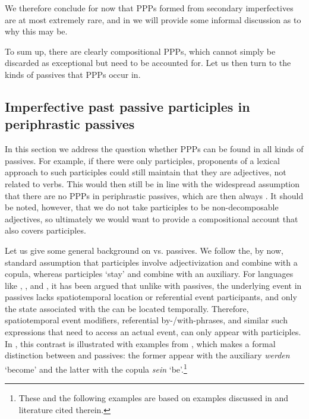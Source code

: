 \documentclass[output=paper,modfonts,newtxmath,hidelinks]{langscibook}
\begin{document}
\noindent We therefore conclude for now that PPPs formed from secondary imperfectives are at most extremely rare, and in  we will provide some informal discussion as to why this may be. 

To sum up, there are clearly compositional  PPPs, which cannot simply be discarded as exceptional but need to be accounted for. Let us then turn to the kinds of passives that  PPPs occur in.

\subsection{Imperfective past passive participles in periphrastic passives} 
\label{passive}

In this section we address the question whether  PPPs can be found in all kinds of passives. For example, if there were only  participles, proponents of a lexical approach to such participles could still maintain that they are adjectives, not related to  verbs. This would then still be in line with the widespread assumption that there are no  PPPs in periphrastic passives, which are then always . It should be noted, however, that we do not take  participles to be non-decomposable adjectives, so ultimately we would want to provide a compositional account that also covers  participles.

Let us give some general background on  vs.  passives. We follow the, by now, standard assumption that  participles involve adjectivization and combine with a copula, whereas  participles `stay'  and combine with an auxiliary. For languages like , , and , it has been argued \citep[see][and literature cited therein]{gehrkesub15, gehrkenllt, gehrkemarcolingua, alexiadou+lingua} that unlike with  passives, the underlying event in  passives lacks spatiotemporal location or referential event participants, and only the state associated with the   can be located temporally. Therefore, spatiotemporal event modifiers, referential by-/with-phrases, and similar such expressions that need to access an actual event, can only appear with  participles. In , this contrast is illustrated with examples from , which makes a formal distinction between  and  passives: the former appear with the auxiliary \textit{werden} `become' and the latter with the copula \textit{sein} `be'.\footnote{These and the following  examples are based on examples discussed in \citet{gehrkenllt} and literature cited therein.}
\end{document}
